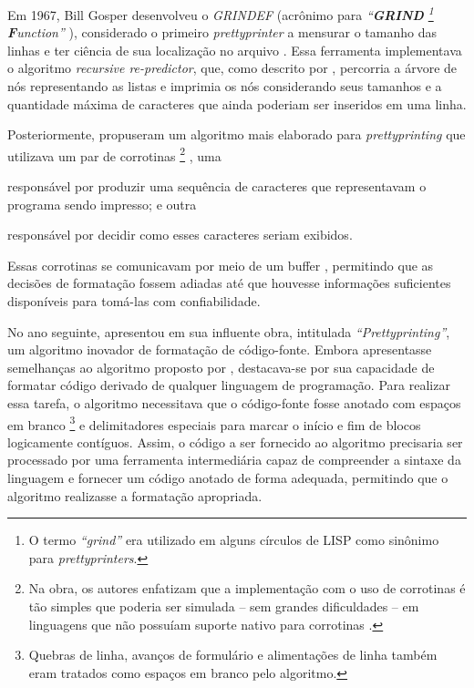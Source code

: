 \documentclass
  [11pt,a4paper,english,brazil,openright,sumario=tradicional,twoside]
  {abntex2}
\begin{document}
  Em 1967, Bill Gosper desenvolveu o \textit{GRINDEF} (acrônimo para
  \textit
    {%
      ``\textbf{GRIND}%
      \footnote
        { O termo \textit{``grind''} era utilizado em alguns círculos de LISP
          como sinônimo para \textit{prettyprinters}.}
      \textbf{F}unction''}%
  ), considerado o primeiro \textit{prettyprinter} a mensurar o tamanho das
  linhas e ter ciência de sua localização no arquivo
  \cites{gosper-2023-twubblesome}{griesemer-2022-cultural}. Essa ferramenta
  implementava o algoritmo \textit{recursive re-predictor}, que, como descrito
  por \textcite{goldstein-1973-pretty}, percorria a árvore de nós representando
  as listas e imprimia os nós considerando seus tamanhos e a quantidade máxima
  de caracteres que ainda poderiam ser inseridos em uma linha.

  Posteriormente, \textcite{hearn-1979-one} propuseram um algoritmo mais
  elaborado para \textit{prettyprinting} que utilizava um par de corrotinas%
  \footnote
    { Na obra, os autores enfatizam que a implementação com o uso de corrotinas
      é tão simples que poderia ser simulada -- sem grandes dificuldades -- em
      linguagens que não possuíam suporte nativo para corrotinas
      \cite[53]{hearn-1979-one}.}%
  , uma
  \begin{inparaenum}
    \item responsável por produzir uma sequência de caracteres que
          representavam o programa sendo impresso; e outra
    \item responsável por decidir como esses caracteres seriam exibidos.
  \end{inparaenum}
  Essas corrotinas se comunicavam por meio de um buffer ,
  permitindo que as decisões de formatação fossem adiadas até que houvesse
  informações suficientes disponíveis para tomá-las com confiabilidade.

  No ano seguinte, \textcite{oppen-1980-prettyprinting} apresentou em sua
  influente obra, intitulada \textit{``Prettyprinting''}, um algoritmo inovador
  de formatação de código-fonte. Embora apresentasse semelhanças ao algoritmo
  proposto por \textcite{hearn-1979-one}, destacava-se por sua capacidade de
  formatar código derivado de qualquer linguagem de programação. Para realizar
  essa tarefa, o algoritmo necessitava que o código-fonte fosse anotado com
  espaços em branco%
  \footnote
    { Quebras de linha, avanços de formulário e alimentações de linha também
      eram tratados como espaços em branco pelo algoritmo.}
  e delimitadores especiais para marcar o início e fim de blocos logicamente
  contíguos. Assim, o código a ser fornecido ao algoritmo precisaria ser
  processado por uma ferramenta intermediária capaz de compreender a sintaxe da
  linguagem e fornecer um código anotado de forma adequada, permitindo que o
  algoritmo realizasse a formatação apropriada.
\end{document}
